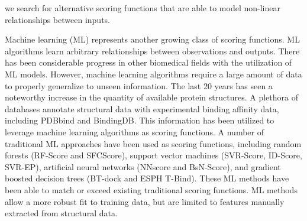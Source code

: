 \documentclass[journal=jcisd8,manuscript=article]{achemso}
\begin{document}
we search for alternative scoring functions that are able to model non-linear relationships between inputs.

Machine learning (ML) represents another growing class of scoring functions\cite{liu2015classification}. ML algorithms learn arbitrary relationships between observations and outputs. There has been considerable progress in other biomedical fields with the utilization of ML models\cite{zitnik2019machine}. However, machine learning algorithms require a large amount of data to properly generalize to unseen information. The last 20 years has seen a noteworthy increase in the quantity of available protein structures\cite{berman2000protein}. A plethora of databases annotate structural data with experimental binding affinity data, including PDBbind and BindingDB\cite{wang2004pdbbind,liu2017forging,gilson2016bindingdb}. This information has been utilized to leverage machine learning algorithms as scoring functions. A number of traditional ML approaches have been used as scoring functions, including random forests (RF-Score\cite{ballester2010machine} and SFCScore\cite{zilian2013sfcscore}), support vector machines (SVR-Score\cite{ballester2012machine}, ID-Score\cite{li2013idscore}, SVR-EP\cite{li2011svr}), artificial neural networks (NNscore\cite{durrant2010nnscore} and BsN-Score\cite{ashtawy2015bsn}), and gradient boosted decision trees (BT-dock\cite{btdock} and ESPH T-Bind\cite{cang2018integration}). These ML methods have been able to match or exceed existing traditional scoring functions. ML methods allow a more robust fit to training data, but are limited to features manually extracted from structural data.
\end{document}
